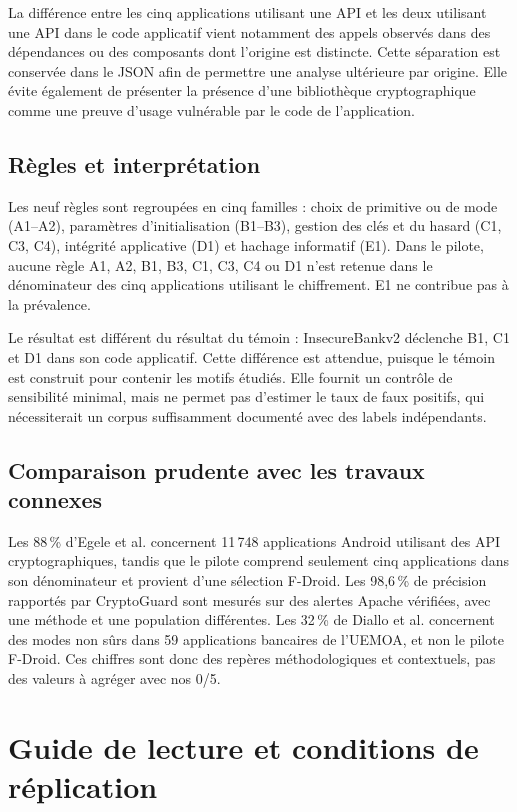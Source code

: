 \documentclass[conference,a4paper]{IEEEtran}
\begin{document}
La différence entre les cinq applications utilisant une API et les deux utilisant une API dans le code applicatif vient notamment des appels observés dans des dépendances ou des composants dont l'origine est distincte. Cette séparation est conservée dans le JSON afin de permettre une analyse ultérieure par origine. Elle évite également de présenter la présence d'une bibliothèque cryptographique comme une preuve d'usage vulnérable par le code de l'application.

\subsection{Règles et interprétation}
Les neuf règles sont regroupées en cinq familles : choix de primitive ou de mode (A1--A2), paramètres d'initialisation (B1--B3), gestion des clés et du hasard (C1, C3, C4), intégrité applicative (D1) et hachage informatif (E1). Dans le pilote, aucune règle A1, A2, B1, B3, C1, C3, C4 ou D1 n'est retenue dans le dénominateur des cinq applications utilisant le chiffrement. E1 ne contribue pas à la prévalence.

Le résultat est différent du résultat du témoin : InsecureBankv2 déclenche B1, C1 et D1 dans son code applicatif. Cette différence est attendue, puisque le témoin est construit pour contenir les motifs étudiés. Elle fournit un contrôle de sensibilité minimal, mais ne permet pas d'estimer le taux de faux positifs, qui nécessiterait un corpus suffisamment documenté avec des labels indépendants.

\subsection{Comparaison prudente avec les travaux connexes}
Les 88\,\% d'Egele et al. concernent 11\,748 applications Android utilisant des API cryptographiques, tandis que le pilote comprend seulement cinq applications dans son dénominateur et provient d'une sélection F-Droid. Les 98,6\,\% de précision rapportés par CryptoGuard sont mesurés sur des alertes Apache vérifiées, avec une méthode et une population différentes. Les 32\,\% de Diallo et al. concernent des modes non sûrs dans 59 applications bancaires de l'UEMOA, et non le pilote F-Droid. Ces chiffres sont donc des repères méthodologiques et contextuels, pas des valeurs à agréger avec nos 0/5.

\section{Guide de lecture et conditions de réplication}
\end{document}
